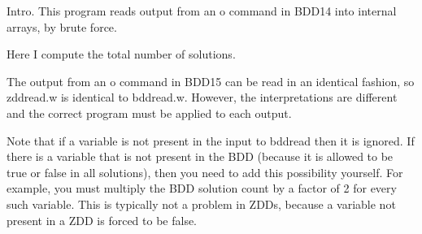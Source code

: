
\datethis

Intro. This program reads output from an {\mc o} command in  {\mc
BDD14}
into internal arrays, by brute force.

Here I compute the total number of solutions.

The output from an {\mc o} command in {\mc BDD15}
can be read in an identical fashion,
so {\mc zddread.w} is identical to {\mc bddread.w}.
However, the interpretations are different
and the correct program must be applied to each output.

Note that if a variable is not present in the input to {\mc bddread}
then it is ignored.
If there is a variable that is not present in the BDD
(because it is allowed to be true or false in all solutions),
then you need to add this possibility yourself.
For example, you must multiply the BDD solution count by a factor of 2
for every such variable.
This is typically not a problem in ZDDs,
because a variable not present in a ZDD is forced to be false.

